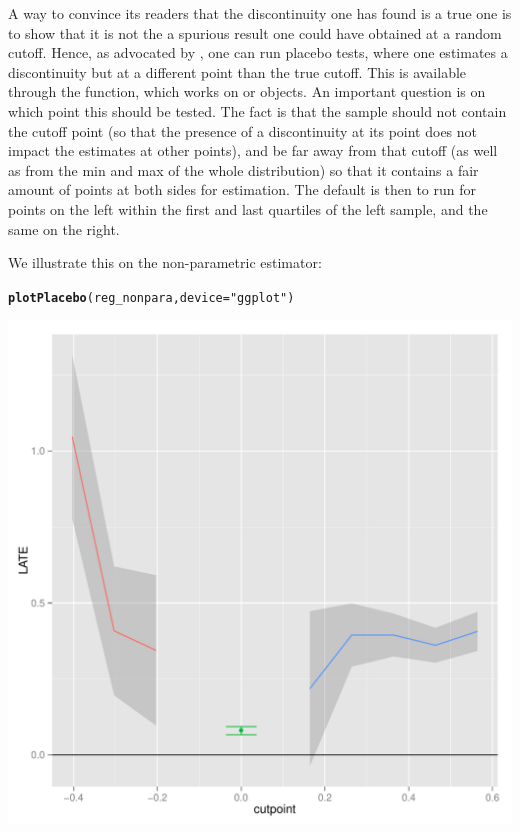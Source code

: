 \documentclass[english,nojss]{jss}\usepackage{graphicx, color}
\makeatletter
\def\maxwidth{ %
  \ifdim\Gin@nat@width>\linewidth
    \linewidth
  \else
    \Gin@nat@width
  \fi
}
\newcommand{\hlfunctioncall}[1]{\textcolor[rgb]{0.501960784313725,0,0.329411764705882}{\textbf{#1}}}%
\newcommand{\hlstring}[1]{\textcolor[rgb]{0.6,0.6,1}{#1}}%
\newenvironment{kframe}{%
 \def\at@end@of@kframe{}%
 \ifinner\ifhmode%
  \def\at@end@of@kframe{\end{minipage}}%
  \begin{minipage}{\columnwidth}%
 \fi\fi%
 \def\FrameCommand##1{\hskip\@totalleftmargin \hskip-\fboxsep
 \colorbox{shadecolor}{##1}\hskip-\fboxsep
     \hskip-\linewidth \hskip-\@totalleftmargin \hskip\columnwidth}%
 \MakeFramed {\advance\hsize-\width
   \@totalleftmargin\z@ \linewidth\hsize
   \@setminipage}}%
 {\par\unskip\endMakeFramed%
 \at@end@of@kframe}
\newenvironment{knitrout}{}{} %
\makeatother
\begin{document}
A way to convince its readers that the discontinuity one has found
is a true one is to show that it is not the a spurious result one
could have obtained at a random cutoff. Hence, as advocated by \citet{ImbensLemieux2008},
one can run placebo tests, where one estimates a discontinuity but
at a different point than the true cutoff. This is available through
the  function, which works on 
or  objects. An important question is on which point
this should be tested. The fact is that the sample should not contain
the cutoff point (so that the presence of a discontinuity at its point
does not impact the estimates at other points), and be far away from
that cutoff (as well as from the min and max of the whole distribution)
so that it contains a fair amount of points at both sides for estimation.
The default is then to run for points on the left within the first
and last quartiles of the left sample, and the same on the right.

We illustrate this on the non-parametric estimator:

\begin{knitrout}
\color{fgcolor}\begin{kframe}
\begin{alltt}
\hlfunctioncall{plotPlacebo}(reg_nonpara, device = \hlstring{"ggplot"})
\end{alltt}
\end{kframe}
\includegraphics[width=\maxwidth]{figure/unnamed-chunk-15} 

\end{knitrout}
\end{document}
